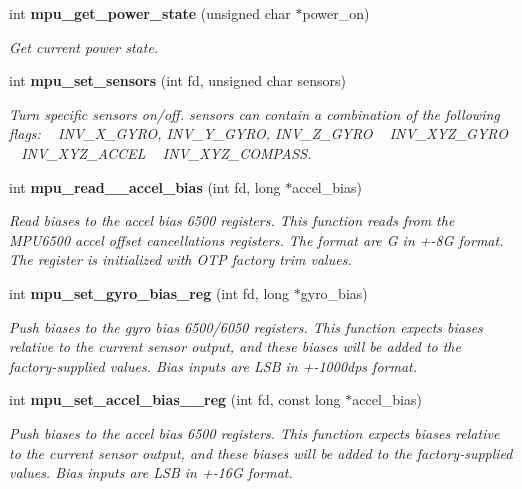 \begin{DoxyCompactItemize}
int \textbf{ mpu\+\_\+get\+\_\+power\+\_\+state} (unsigned char $\ast$power\+\_\+on)
\begin{DoxyCompactList}\small\item\em Get current power state. \end{DoxyCompactList}\item 
int \textbf{ mpu\+\_\+set\+\_\+sensors} (int fd, unsigned char sensors)
\begin{DoxyCompactList}\small\item\em Turn specific sensors on/off. {\itshape sensors} can contain a combination of the following flags\+: ~\newline
 I\+N\+V\+\_\+\+X\+\_\+\+G\+Y\+RO, I\+N\+V\+\_\+\+Y\+\_\+\+G\+Y\+RO, I\+N\+V\+\_\+\+Z\+\_\+\+G\+Y\+RO ~\newline
 I\+N\+V\+\_\+\+X\+Y\+Z\+\_\+\+G\+Y\+RO ~\newline
 I\+N\+V\+\_\+\+X\+Y\+Z\+\_\+\+A\+C\+C\+EL ~\newline
 I\+N\+V\+\_\+\+X\+Y\+Z\+\_\+\+C\+O\+M\+P\+A\+SS. \end{DoxyCompactList}\item 
int \textbf{ mpu\+\_\+read\+\_\+\_\+accel\+\_\+bias} (int fd, long $\ast$accel\+\_\+bias)
\begin{DoxyCompactList}\small\item\em Read biases to the accel bias 6500 registers. This function reads from the M\+P\+U6500 accel offset cancellations registers. The format are G in +-\/8G format. The register is initialized with O\+TP factory trim values. \end{DoxyCompactList}\item 
int \textbf{ mpu\+\_\+set\+\_\+gyro\+\_\+bias\+\_\+reg} (int fd, long $\ast$gyro\+\_\+bias)
\begin{DoxyCompactList}\small\item\em Push biases to the gyro bias 6500/6050 registers. This function expects biases relative to the current sensor output, and these biases will be added to the factory-\/supplied values. Bias inputs are L\+SB in +-\/1000dps format. \end{DoxyCompactList}\item 
int \textbf{ mpu\+\_\+set\+\_\+accel\+\_\+bias\+\_\+\_\+reg} (int fd, const long $\ast$accel\+\_\+bias)
\begin{DoxyCompactList}\small\item\em Push biases to the accel bias 6500 registers. This function expects biases relative to the current sensor output, and these biases will be added to the factory-\/supplied values. Bias inputs are L\+SB in +-\/16G format. \end{DoxyCompactList}\item 

\end{DoxyCompactItemize}
